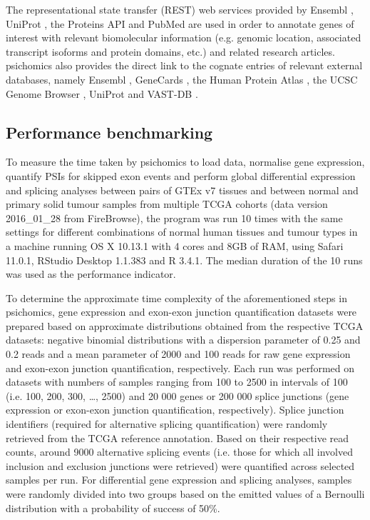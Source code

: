 The representational state transfer (REST) web services provided by Ensembl \cite{yates:2015uo}, UniProt \cite{wu:2006vq}, the Proteins API \cite{nightingale:2017uq} and PubMed \cite{roberts:2001tg} are used in order to annotate genes of interest with relevant biomolecular information (e.g. genomic location, associated transcript isoforms and protein domains, etc.) and related research articles. psichomics also provides the direct link to the cognate entries of relevant external databases, namely Ensembl \cite{cunningham:2015wt}, GeneCards \cite{fishilevich:2016wh}, the Human Protein Atlas \cite{uhlen:2015tg}, the UCSC Genome Browser \cite{goldman:2015un}, UniProt \cite{wu:2006vq} and VAST-DB \cite{tapial:2017ui}.

\subsection{Performance benchmarking}

To measure the time taken by psichomics to load data, normalise gene expression, quantify PSIs for skipped exon events and perform global differential expression and splicing analyses between pairs of GTEx v7 tissues and between normal and primary solid tumour samples from multiple TCGA cohorts (data version 2016\_01\_28 from FireBrowse), the program was run 10 times with the same settings for different combinations of normal human tissues and tumour types in a machine running OS X 10.13.1 with 4 cores and 8GB of RAM, using Safari 11.0.1, RStudio Desktop 1.1.383 and R 3.4.1. The median duration of the 10 runs was used as the performance indicator.

To determine the approximate time complexity of the aforementioned steps in psichomics, gene expression and exon-exon junction quantification datasets were prepared based on approximate distributions obtained from the respective TCGA datasets: negative binomial distributions with a dispersion parameter of 0.25 and 0.2 reads and a mean parameter of 2000 and 100 reads for raw gene expression and exon-exon junction quantification, respectively. Each run was performed on datasets with numbers of samples ranging from 100 to 2500 in intervals of 100 (i.e. 100, 200, 300, …, 2500) and 20 000 genes or 200 000 splice junctions (gene expression or exon-exon junction quantification, respectively). Splice junction identifiers (required for alternative splicing quantification) were randomly retrieved from the TCGA reference annotation. Based on their respective read counts, around 9000 alternative splicing events (i.e. those for which all involved inclusion and exclusion junctions were retrieved) were quantified across selected samples per run. For differential gene expression and splicing analyses, samples were randomly divided into two groups based on the emitted values of a Bernoulli distribution with a probability of success of 50\%.

